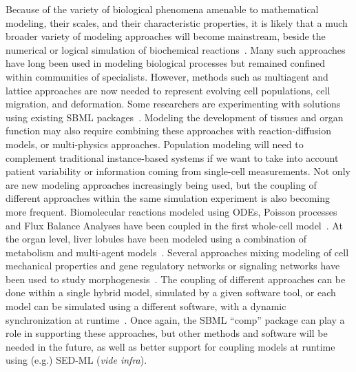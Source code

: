 \documentclass[]{draft-sbml-paper}
\begin{document}
Because of the variety of biological phenomena amenable to mathematical modeling, their scales, and their characteristic properties, it is likely that a much broader variety of modeling approaches will become mainstream, beside the numerical or logical simulation of biochemical reactions~\citep{Cvijovic2014bridging}. Many such approaches have long been used in modeling biological processes but remained confined within communities of specialists. However, methods such as multiagent and lattice approaches are now needed to represent evolving cell populations, cell migration, and deformation. Some researchers are experimenting with solutions using existing SBML packages~\citep{watanabe2016efficient, varela2018epilog}.  Modeling the development of tissues and organ function may also require combining these approaches with reaction-diffusion models, or multi-physics approaches. Population modeling will need to complement traditional instance-based systems if we want to take into account patient variability or information coming from single-cell measurements. Not only are new modeling approaches increasingly being used, but the coupling of different approaches within the same simulation experiment is also becoming more frequent. Biomolecular reactions modeled using ODEs, Poisson processes and Flux Balance Analyses have been coupled in the first whole-cell model~\citep{Karr2012a}. At the organ level, liver lobules have been modeled using a combination of metabolism and multi-agent models~\citep{schliess2014integrated}. Several approaches mixing modeling of cell mechanical properties and gene regulatory networks or signaling networks have been used to study morphogenesis~\citep{tanaka2015lbibcell, delile2017cell}. The coupling of different approaches can be done within a single hybrid model, simulated by a given software tool, or each model can be simulated using a different software, with a dynamic synchronization at runtime~\citep{mattioni2013integration}.  Once again, the SBML ``comp'' package can play a role in supporting these approaches, but other methods and software will be needed in the future, as well as better support for coupling models at runtime using (e.g.) SED-ML (\emph{vide infra}). 
\end{document}

